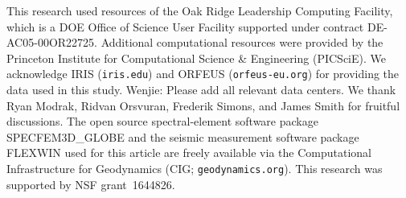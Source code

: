 \documentclass[extra,mreferee]{gji}
\begin{document}
\begin{acknowledgments}


This research used resources of the Oak Ridge Leadership Computing Facility, which is a DOE Office of Science User Facility supported under contract DE-AC05-00OR22725.
Additional computational resources were provided by the Princeton Institute for Computational Science \& Engineering (PICSciE).
We acknowledge IRIS ({\tt iris.edu}) and ORFEUS ({\tt orfeus-eu.org}) for providing the data used in this study.
{\color{red} Wenjie: Please add all relevant data centers.} We thank Ryan Modrak, Ridvan Orsvuran, Frederik Simons, and James Smith for fruitful discussions.
The open source spectral-element software package SPECFEM3D\_GLOBE and the seismic measurement software package FLEXWIN used for this article are freely available via the Computational Infrastructure for Geodynamics (CIG; {\tt geodynamics.org}). This research was supported by NSF grant~1644826.

\end{acknowledgments}

\newpage


\end{document}
